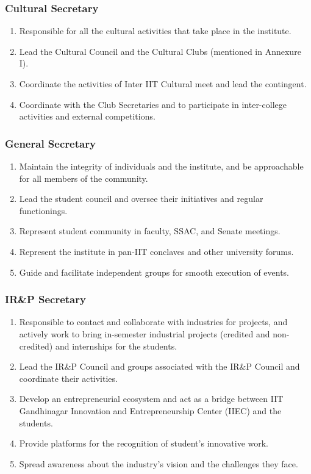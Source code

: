 \documentclass[12pt]{article}
\begin{document}
\subsubsection*{Cultural Secretary}
\begin{enumerate}
    \item Responsible for all the cultural activities that take place in the institute.
    \item Lead the Cultural Council and the Cultural Clubs (mentioned in Annexure I).
    \item Coordinate the activities of Inter IIT Cultural meet and lead the contingent.
    \item Coordinate with the Club Secretaries and to participate in inter-college activities and external competitions.
\end{enumerate}

\subsubsection*{General Secretary}
\begin{enumerate}
    \item Maintain the integrity of individuals and the institute, and be approachable for all members of the community.
    \item Lead the student council and oversee their initiatives and regular functionings.
    \item Represent student community in faculty, SSAC, and Senate meetings.
    \item Represent the institute in pan-IIT conclaves and other university forums.
    \item Guide and facilitate independent groups for smooth execution of events.
\end{enumerate}

\subsubsection*{IR\&P Secretary}
\begin{enumerate}
    \item Responsible to contact and collaborate with industries for projects, and actively work to bring in-semester industrial projects (credited and non-credited) and internships for the students.
    \item Lead the IR\&P Council and groups associated with the IR\&P Council and coordinate their activities.
    \item Develop an entrepreneurial ecosystem and act as a bridge between IIT Gandhinagar Innovation and Entrepreneurship Center (IIEC) and the students.
    \item Provide platforms for the recognition of student's innovative work.
    \item Spread awareness about the industry’s vision and the challenges they face.
\end{enumerate}
\end{document}
